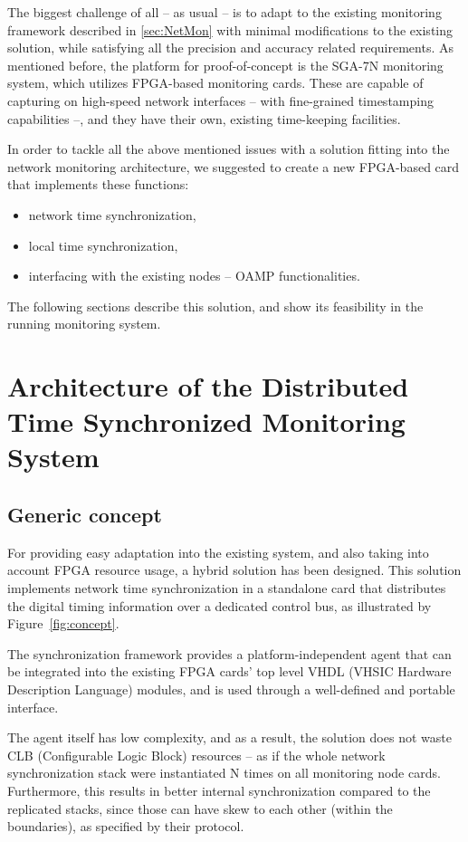 \documentclass[journal]{IEEEtran}
\begin{document}
The biggest challenge of all -- as usual -- is to adapt to the existing monitoring framework described in
\ref{sec:NetMon}
with minimal modifications to the existing solution, while satisfying all the precision and accuracy related requirements.
As mentioned before, the platform for proof-of-concept is the SGA-7N monitoring system, which utilizes FPGA-based monitoring cards. These are capable of capturing on high-speed network interfaces -- with fine-grained timestamping capabilities --, and they have their own, existing time-keeping facilities.

In order to tackle all the above mentioned issues with a solution fitting into the network monitoring architecture, we suggested to create a new FPGA-based card that implements these functions:
\begin{itemize}
    \item network time synchronization,
    \item local time synchronization,
    \item interfacing with the existing nodes -- OAMP functionalities.
\end{itemize}

The following sections describe this solution, and show its feasibility in the running monitoring system.

\IEEEpubidadjcol %

\section{Architecture of the Distributed Time Synchronized Monitoring System}

\subsection{Generic concept}
For providing easy adaptation into the existing system, and also taking into account FPGA resource usage, a hybrid
solution
has been designed. This solution implements network time synchronization in a standalone card that distributes the digital timing
information over a dedicated control bus, as illustrated by Figure~\ref{fig:concept}.

The synchronization framework provides a platform-independent agent that
can be integrated into the existing FPGA cards' top level VHDL (VHSIC Hardware Description Language) modules, and is used through a well-defined and portable interface.

The agent itself has low complexity, and as a result, the solution does not waste CLB (Configurable Logic Block) resources -- as if the whole network
synchronization stack were instantiated N times on all monitoring node cards. Furthermore, this results in better internal
synchronization
compared to the replicated stacks, since those can have skew to each other (within the boundaries), as specified by their
protocol.
\end{document}
